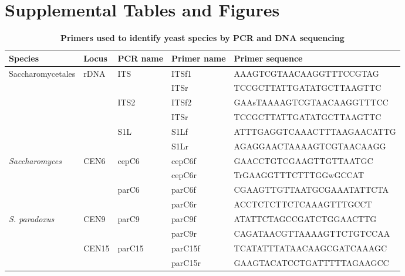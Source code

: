 \documentclass[12pt]{article}
\begin{document}
\clearpage

\section*{Supplemental Tables and Figures}
\label{sec:Supplemental Tables and Figures}

\setcounter{table}{0}
\renewcommand{\tablename}{Supplemental Table}

\begingroup
\renewcommand*{\thefootnote}{\alph{footnote}}
\begin{table}[h!] \centering 
 \begin{threeparttable}
\caption{{\bf Primers used to identify yeast species by PCR and DNA sequencing }} 
      \label{tab:scsp_table}
\begin{tabular}{llp{1cm}p{1.3cm}l} \hline
Species & Locus & PCR name & Primer name & Primer sequence \\ \hline
Saccharomycetales & rDNA\footnote\ & ITS & ITSf1 & AAAGTCGTAACAAGGTTTCCGTAG \\
  &  &  & ITSr & TCCGCTTATTGATATGCTTAAGTTC \\
 &  & ITS2 & ITSf2 & GAAsTAAAAGTCGTAACAAGGTTTCC \\
 &  &  & ITSr & TCCGCTTATTGATATGCTTAAGTTC \\
 &  & S1L & S1Lf & ATTTGAGGTCAAACTTTAAGAACATTG \\
 &  &  & S1Lr & AGAGGAACTAAAAGTCGTAACAAGG \\
\textit{Saccharomyces} & CEN6 & cepC6\footnote\ & cepC6f & GAACCTGTCGAAGTTGTTAATGC \\
  &  &  & cepC6r & TrGAAGGTTTCTTTGGwGCCAT \\
  &  & parC6\footnote\ & parC6f & CGAAGTTGTTAATGCGAAATATTCTA \\
  &  &  & parC6r & ACCTCTCTTCTCAAAGTTTGCCT \\
 \textit{S. paradoxus} & CEN9 & parC9 & parC9f & ATATTCTAGCCGATCTGGAACTTG \\
  &  &  & parC9r & CAGATAACGTTAAAAGTTCTGTCCAA \\
  & CEN15 & parC15 & parC15f & TCATATTTATAACAAGCGATCAAAGC \\
  &  &  & parC15r & GAAGTACATCCTGATTTTTAGAAGCC \\
\hline
\end{tabular}


\end{threeparttable}
\end{table}
\end{document}
